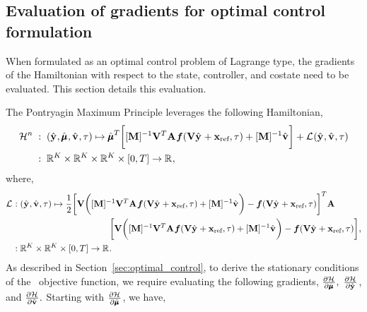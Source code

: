 \documentclass[3p,computermodern,10pt]{elsarticle}
\begin{document}
\begin{appendices}
\section{Evaluation of gradients for optimal control formulation}\label{appendix:optimal_control}
When formulated as an optimal control problem of Lagrange type, the gradients of the Hamiltonian with respect to the state, controller, and costate 
need to be evaluated. This section details this evaluation.

The Pontryagin Maximum Principle leverages the following Hamiltonian,
\begin{align*}
\mathcal{H}^n \; &: \;  (\hat{\mathbf{y}}^{},\hat{\pmb \mu}^{},\hat{\mathbf{v}}^{},\tau) \mapsto 
 \hat{\pmb \mu}^{T} \bigg[  [\mathbf{M}]^{-1}\mathbf {V}^T \mathbf{A}^{}\boldsymbol f(\mathbf {V} \hat{\mathbf{y}}^{} + \mathbf{x}_\text{ref},\tau) + [\mathbf{M}]^{-1}\hat{\mathbf{v}}^{} \bigg] +  \mathcal{L}^{}(\hat{\mathbf{y}}^{},\hat{\mathbf{v}}^{},\tau) \\
&: \; \mathbb{R}^{K} \times \mathbb{R}^{K} \times \mathbb{R}^{K} \times [0,T] \rightarrow \mathbb{R}^{},
\end{align*} 
where,
\begin{align*}
 \mathcal{L}^{} &:  (\hat{\mathbf{y}}^{},\hat{\mathbf{v}}^{},\tau)
\mapsto \frac{1}{2} \bigg[ \mathbf {V} \bigg(  [\mathbf{M}]^{-1}\mathbf {V}^T
\mathbf{A}^{}  \boldsymbol f(\mathbf {V} \hat{\mathbf{y}}^{} + \mathbf{x}_\text{ref},\tau) + [\mathbf{M}]^{-1}\hat{\mathbf{v}}^{} \bigg) -
\boldsymbol f(\mathbf {V} \hat{\mathbf{y}}^{} + \mathbf{x}_\text{ref},\tau) \bigg]^T
\mathbf{A}^{}  \\ & \hspace{1.5 in}\bigg[ \mathbf {V} \bigg(
[\mathbf{M}]^{-1}\mathbf {V}^T \mathbf{A}^{}\boldsymbol f(\mathbf {V} \hat{\mathbf{y}}^{} + \mathbf{x}_\text{ref},\tau) + [\mathbf{M}]^{-1}\hat{\mathbf{v}}^{}
\bigg) - \boldsymbol f( \mathbf {V} \hat{\mathbf{y}}^{} + \mathbf{x}_\text{ref},\tau ) \bigg]
, \nonumber \\ & : \mathbb{R}^{K} \times \mathbb{R}^{K} \times [0,T] \rightarrow \mathbb{R}^{}.
\end{align*} 
As described in Section~\ref{sec:optimal_control}, to derive the stationary conditions of the \methodAcronym\ objective function, we require evaluating the following gradients,
$ \frac{\partial \mathcal{H}^{}}{\partial \hat{\pmb \mu}^{}{}}, \;   \frac{\partial \mathcal{H}^{}}{\partial \hat{\mathbf{y}}^{}{}}$, and $\frac{\partial \mathcal{H}^{}}{\partial \hat{\mathbf{v}}^{}{}}.$  Starting with $\frac{\partial \mathcal{H}^{}}{\partial \hat{\pmb \mu}^{}{}}$, we have,

\end{appendices}
\end{document}
